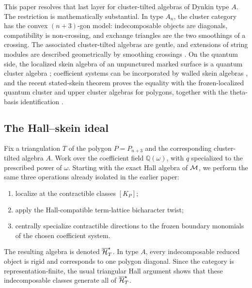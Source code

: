 This paper resolves that last layer for cluster-tilted algebras of Dynkin type
$A$.  The restriction is mathematically substantial.  In type $A_n$, the
cluster category has the convex $(n+3)$-gon model: indecomposable objects are
diagonals, compatibility is non-crossing, and exchange triangles are the two
smoothings of a crossing.  The associated cluster-tilted algebras are gentle,
and extensions of string modules are described geometrically by smoothing
crossings \cite{CanakciSchroll}.  On the quantum side, the localized skein
algebra of an unpunctured marked surface is a quantum cluster algebra
\cite{Muller}; coefficient systems can be incorporated by walled skein
algebras \cite{IshibashiKanoYuasa}, and the recent stated-skein theorem proves
the equality with the frozen-localized quantum cluster and upper cluster
algebras for polygons, together with the theta-basis identification
\cite{CaoHuangWang}.

\subsection*{The Hall--skein ideal}

Fix a triangulation $T$ of the polygon $P=P_{n+3}$ and the corresponding
cluster-tilted algebra $A$.  Work over the coefficient field
$\mathbb Q(\omega)$, with $q$ specialized to the prescribed power of
$\omega$.  Starting with the exact Hall algebra of $\mathcal M$, we perform the same
three operations already isolated in the earlier paper:
\begin{enumerate}[label=(\alph*),leftmargin=2.3em]
\item localize at the contractible classes $[K_P]$;
\item apply the Hall-compatible term-lattice bicharacter twist;
\item centrally specialize contractible directions to the frozen boundary
      monomials of the chosen coefficient system.
\end{enumerate}
The resulting algebra is denoted $\overline{\mathcal H}_{T}^{\star}$.  In type $A$, every indecomposable
reduced object is rigid and corresponds to one polygon diagonal.  Since the
category is representation-finite, the usual triangular Hall argument shows
that these indecomposable classes generate all of $\overline{\mathcal H}_{T}^{\star}$.

